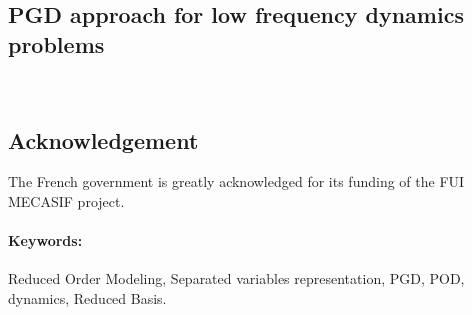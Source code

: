 \documentclass[12pt,a4paper]{article}
\begin{document}
\begin{center}
\section*{PGD approach for low frequency dynamics problems}



\end{center}

\\	



\subsection*{Acknowledgement}
The French government is greatly acknowledged for its funding of the FUI MECASIF project.
\paragraph*{Keywords:}
Reduced Order Modeling, Separated variables representation, PGD, POD, dynamics, Reduced Basis.


\end{document}
